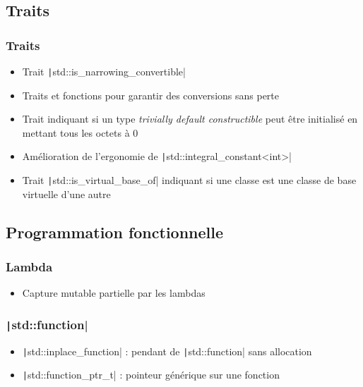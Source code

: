 \documentclass[C++.tex]{subfiles}
\begin{document}
\subsection*{Traits}
\begin{frame}[fragile]
	\frametitle{Traits}
	\begin{itemize}
		\item Trait \texttt|std::is_narrowing_convertible|
		\item Traits et fonctions pour garantir des conversions sans perte
		\item Trait indiquant si un type \textit{trivially default constructible} peut être initialisé en mettant tous les octets à 0
		\item Amélioration de l'ergonomie de \texttt|std::integral_constant<int>|
		\item Trait \texttt|std::is_virtual_base_of| indiquant si une classe est une classe de base virtuelle d'une autre
	\end{itemize}

\end{frame}

\subsection*{Programmation fonctionnelle}
\begin{frame}[fragile]
	\frametitle{Lambda}
	\begin{itemize}
		\item Capture mutable partielle par les lambdas
	\end{itemize}
\end{frame}

\begin{frame}[fragile]
	\frametitle{\texttt|std::function|}
	\begin{itemize}
		\item \texttt|std::inplace_function| : pendant de \texttt|std::function| sans allocation
		\item \texttt|std::function_ptr_t| : pointeur générique sur une fonction
	\end{itemize}

\end{frame}
\end{document}
